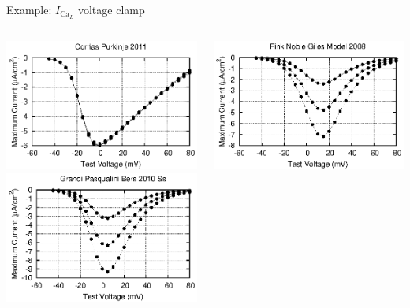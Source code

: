 \documentclass[t,xcolor={usenames,dvipsnames}]{beamer}
\begin{document}
\begin{frame}{Example: $I_{\textrm{Ca}_L}$ voltage clamp}
\begin{columns}[T]
\begin{column}{.33\linewidth}
\begin{center}
\includegraphics[width=\textwidth]{corrias_purkinje_2011_ICaL_IV_curve}\\
\vspace{.1cm}
\includegraphics[width=\textwidth]{grandi_pasqualini_bers_2010_ss_ICaL_IV_curve}
\end{center}
\end{column}
\begin{column}{.33\linewidth}
\begin{center}
\includegraphics[width=\textwidth]{fink_noble_giles_model_2008_ICaL_IV_curve}\\

\end{center}
\end{column}
\end{columns}
\end{frame}
\end{document}
